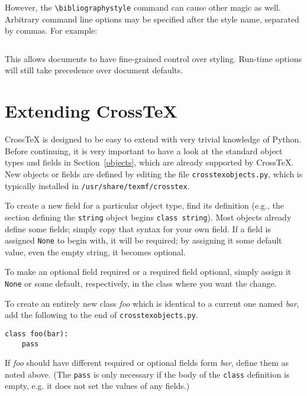 \documentclass{article}
\newcommand{\XTeX}{Cross\TeX}
\begin{document}
However, the \texttt{\textbackslash{}bibliographystyle} command can cause other magic as well. Arbitrary command line options may be specified after the style name, separated by commas. For example:

\begin{small}\begin{verbatim}

\end{verbatim}\end{small}

This allows documents to have fine-grained control over styling. Run-time options will still take precedence over document defaults.



\section{Extending \XTeX{}}
\label{extending}

\XTeX{} is designed to be easy to extend with very trivial knowledge of Python. Before continuing, it is very important to have a look at the standard object types and fields in Section~\ref{objects}, which are already supported by \XTeX{}. New objects or fields are defined by editing the file \texttt{crosstexobjects.py}, which is typically installed in \texttt{/usr/share/texmf/crosstex}.

To create a new field for a particular object type, find its definition (e.g., the section defining the \texttt{string} object begins \texttt{class string}). Most objects already define some fields; simply copy that syntax for your own field. If a field is assigned \texttt{None} to begin with, it will be required; by assigning it some default value, even the empty string, it becomes optional.

To make an optional field required or a required field optional, simply assign it \texttt{None} or some default, respectively, in the class where you want the change.

To create an entirely new class \textit{foo} which is identical to a current one named \textit{bar}, add the following to the end of \texttt{crosstexobjects.py}.

\begin{small}\begin{verbatim}
class foo(bar):
    pass
\end{verbatim}\end{small}

If \textit{foo} should have different required or optional fields form \textit{bar}, define them as noted above. (The \texttt{pass} is only necessary if the body of the \texttt{class} definition is empty, e.g. it does not set the values of any fields.)
\end{document}
